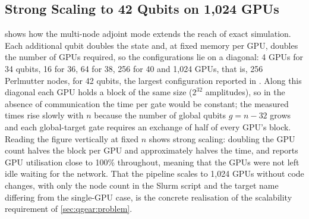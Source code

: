 \subsection{Strong Scaling to 42 Qubits on 1,024 GPUs}\label{sec:qgear:results-scaling}

 shows how the multi-node adjoint mode extends the reach of exact simulation. Each additional qubit doubles the state and, at fixed memory per GPU, doubles the number of GPUs required, so the configurations lie on a diagonal: 4 GPUs for 34 qubits, 16 for 36, 64 for 38, 256 for 40 and 1,024 GPUs, that is, 256 Perlmutter nodes, for 42 qubits, the largest configuration reported in \cite{guo2025qgear}. Along this diagonal each GPU holds a block of the same size ($2^{32}$ amplitudes), so in the absence of communication the time per gate would be constant; the measured times rise slowly with $n$ because the number of global qubits $g=n-32$ grows and each global-target gate requires an exchange of half of every GPU's block. Reading the figure vertically at fixed $n$ shows strong scaling: doubling the GPU count halves the block per GPU and approximately halves the time, and \cite{guo2025qgear} reports GPU utilisation close to 100\% throughout, meaning that the GPUs were not left idle waiting for the network. That the pipeline scales to 1,024 GPUs without code changes, with only the node count in the Slurm script and the target name differing from the single-GPU case, is the concrete realisation of the scalability requirement of \cref{sec:qgear:problem}.

